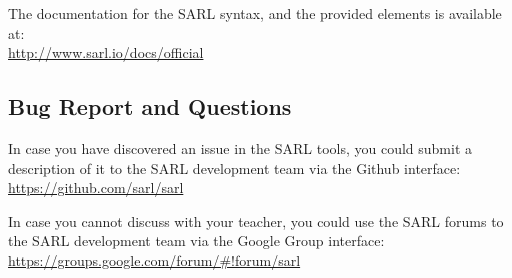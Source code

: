 The documentation for the SARL syntax, and the provided elements is available at:\\
\url{http://www.sarl.io/docs/official}

\subsection{Bug Report and Questions}

In case you have discovered an issue in the SARL tools, you could submit a description of it to the SARL development team via the Github interface:\\
\url{https://github.com/sarl/sarl}

In case you cannot discuss with your teacher, you could use the SARL forums to the SARL development team via the Google Group interface:\\
\url{https://groups.google.com/forum/#!forum/sarl}

